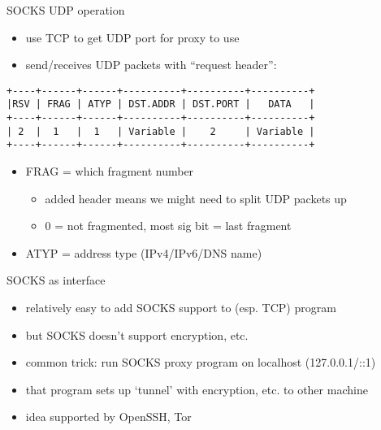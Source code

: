 \begin{frame}[fragile,label=udpSocks]{SOCKS UDP operation}
    \begin{itemize}
    \item use TCP to get UDP port for proxy to use
    \item send/receives UDP packets with ``request header'':
    \end{itemize}
\begin{Verbatim}
+----+------+------+----------+----------+----------+
|RSV | FRAG | ATYP | DST.ADDR | DST.PORT |   DATA   |
+----+------+------+----------+----------+----------+
| 2  |  1   |  1   | Variable |    2     | Variable |
+----+------+------+----------+----------+----------+
\end{Verbatim}
    \begin{itemize}
    \item FRAG = which fragment number
        \begin{itemize}
        \item added header means we might need to split UDP packets up
        \item 0 = not fragmented, most sig bit = last fragment
        \end{itemize}
    \item ATYP = address type (IPv4/IPv6/DNS name)
    \end{itemize}
\end{frame}

\begin{frame}{SOCKS as interface}
    \begin{itemize}
    \item relatively easy to add SOCKS support to (esp. TCP) program
    \item but SOCKS doesn't support encryption, etc.
    \vspace{.5cm}
    \item common trick: run SOCKS proxy program on localhost (127.0.0.1/::1)
    \item that program sets up `tunnel' with encryption, etc. to other machine
    \vspace{.5cm}
    \item idea supported by OpenSSH, Tor
    \end{itemize}
\end{frame}
